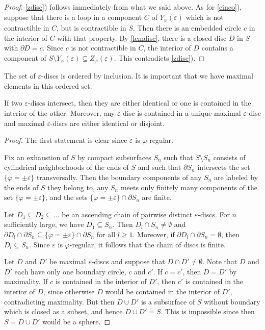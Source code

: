 \begin{proof}
\ref{zdisc}) follows immediately from what we said above.
As for \ref{cinco}), suppose that there is a loop in a component $C$ of $Y_{\varphi}({\varepsilon})$
which is not contractible in $C$, but is contractible in $S$.
Then there is an embedded circle $c$ in the interior of $C$ with that property.
By \cref{lemdisc}, there is a closed disc $D$ in $S$ with $\partial D=c$.
Since $c$ is not contractible in $C$,
the interior of $D$ contains a component of $S\setminus Y_{\varphi}({\varepsilon})\subseteq Z_{\varphi}({\varepsilon})$.
This contradicts \ref{zdisc}).
\end{proof}

The set of ${\varepsilon}$-discs is ordered by inclusion.
It is important that we have maximal elements in this ordered set.

\begin{lem}\label{maxed}
If two ${\varepsilon}$-discs intersect, then they are either identical
or one is contained in the interior of the other.
Moreover, any ${\varepsilon}$-disc is contained in a unique maximal ${\varepsilon}$-disc
and maximal ${\varepsilon}$-discs are either identical or disjoint.
\end{lem}

\begin{proof}
The first statement is clear since ${\varepsilon}$ is ${\varphi}$-regular.

Fix an exhaustion of $S$ by compact subsurfaces $S_n$
such that $S\setminus S_n$ consists of cylindrical neighborhoods of the ends of $S$
and such that $\partial S_n$ intersects the set $\{{\varphi}=\pm{\varepsilon}\}$ transversally.
Then the boundary components of any $S_n$ are labeled by the ends of $S$ they belong to,
any $S_n$ meets only finitely many components of the set $\{{\varphi}=\pm{\varepsilon}\}$,
and the sets $\{{\varphi}=\pm{\varepsilon}\}\cap\partial S_n$ are finite.

Let $D_1\subseteq D_2\subseteq\dots$ be an ascending chain of pairwise distinct ${\varepsilon}$-discs.
For $n$ sufficiently large, we have $D_1\subseteq S_n$. 
Then $D_l\cap S_n\ne\emptyset$
and $\partial D_l\cap\partial S_n\subseteq\{{\varphi}=\pm{\varepsilon}\}\cap\partial S_n$ for all $l\ge1$.
Moreover, if $\partial D_l\cap\partial S_n=\emptyset$, then $D_l\subseteq S_n$.
Since ${\varepsilon}$ is ${\varphi}$-regular, it follows that the chain of discs is finite.

Let $D$ and $D'$ be maximal ${\varepsilon}$-discs and suppose that $D\cap D'\ne\emptyset$.
Note that $D$ and $D'$ each have only one boundary circle, $c$ and $c'$.
If $c=c'$, then $D=D'$ by maximality.
If $c$ is contained in the interior of $D'$, then $c'$ is contained in the interior of $D$,
since otherwise $D$ would be contained in the interior of $D'$, contradicting maximality.
But then $D\cup D'$ is a subsurface of $S$ without boundary which is closed as a subset,
and hence $D\cup D'=S$.
This is impossible since then $S=D\cup D'$ would be a sphere. 
\end{proof}

